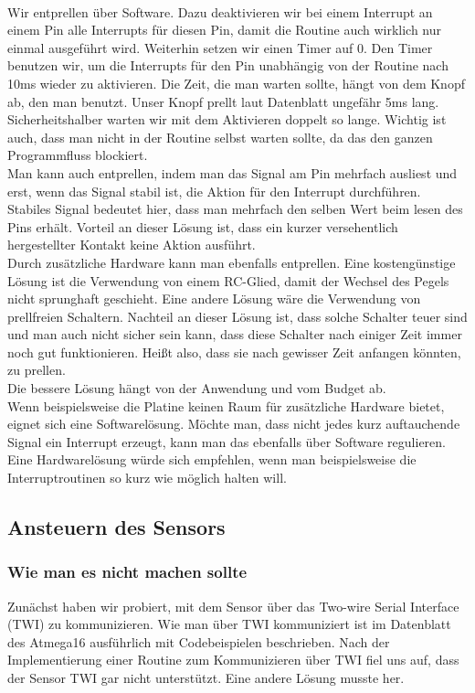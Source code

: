 \documentclass[]{article}
\begin{document}
\\Wir entprellen über Software. Dazu deaktivieren wir bei einem Interrupt an einem Pin alle Interrupts für diesen Pin, damit die Routine auch wirklich nur einmal ausgeführt wird. Weiterhin setzen wir einen Timer auf 0. Den Timer benutzen wir, um die Interrupts für den Pin unabhängig von der Routine nach 10ms wieder zu aktivieren. Die Zeit, die man warten sollte, hängt von dem Knopf ab, den man benutzt. Unser Knopf prellt laut Datenblatt ungefähr 5ms lang. Sicherheitshalber warten wir mit dem Aktivieren doppelt so lange. Wichtig ist auch, dass man nicht in der Routine selbst warten sollte, da das den ganzen Programmfluss blockiert. 
\\Man kann auch entprellen, indem man das Signal am Pin mehrfach ausliest und erst, wenn das Signal stabil ist, die Aktion für den Interrupt durchführen. Stabiles Signal bedeutet hier, dass man mehrfach den selben Wert beim lesen des Pins erhält. Vorteil an dieser Lösung ist, dass ein kurzer versehentlich hergestellter Kontakt keine Aktion ausführt.
\\Durch zusätzliche Hardware kann man ebenfalls entprellen. Eine kostengünstige Lösung ist die Verwendung von einem RC-Glied, damit der Wechsel des Pegels nicht sprunghaft geschieht. Eine andere Lösung wäre die Verwendung von prellfreien Schaltern. Nachteil an dieser Lösung ist, dass solche Schalter teuer sind und man auch nicht sicher sein kann, dass diese Schalter nach einiger Zeit immer noch gut funktionieren. Heißt also, dass sie nach gewisser Zeit anfangen könnten, zu prellen.
\\Die bessere Lösung hängt von der Anwendung und vom Budget ab. 
\\Wenn beispielsweise die Platine keinen Raum für zusätzliche Hardware bietet, eignet sich eine Softwarelösung. Möchte man, dass nicht jedes kurz auftauchende Signal ein Interrupt erzeugt, kann man das ebenfalls über Software regulieren. 
\\Eine Hardwarelösung würde sich empfehlen, wenn man beispielsweise die Interruptroutinen so kurz wie möglich halten will. 

\subsection{Ansteuern des Sensors}
\subsubsection{Wie man es nicht machen sollte}
Zunächst haben wir probiert, mit dem Sensor über das Two-wire Serial Interface (TWI) zu kommunizieren. Wie man über TWI kommuniziert ist im Datenblatt des Atmega16 ausführlich mit Codebeispielen beschrieben. Nach der Implementierung einer Routine zum Kommunizieren über TWI fiel uns auf, dass der Sensor TWI gar nicht unterstützt. Eine andere Lösung musste her.
\end{document}
